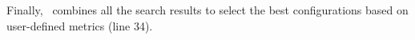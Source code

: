 Finally, \search\ combines all the search results to select the best configurations based on user-defined metrics (line 34).









